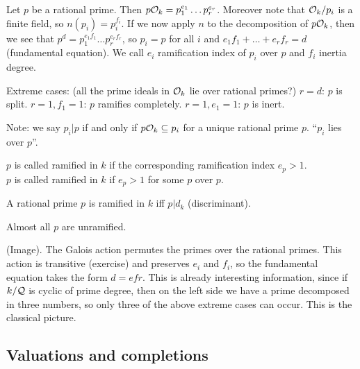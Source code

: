 \begin{outline}
Let $p$ be a rational prime. Then $p \mathcal{O}_k = p_1^{e_1} \ldots p_r^{e_r}$. Moreover note that $\mathcal{O}_k /p_i$ is a finite field, so $n(p_i) = p_i^{f_i}$. If we now apply $n$ to the decomposition of $p\mathcal{O}_k$, then we see that $p^d = p_1^{e_1 f_1}\ldots p_r^{e_r f_r}$, so $p_i=p$ for all $i$ and $e_1 f_1 + \ldots + e_r f_r = d$ (fundamental equation). We call $e_i$ ramification index of $p_i$ over $p$ and $f_i$ inertia degree. 

\1 Extreme cases: (all the prime ideals in $\mathcal{O}_k$ lie over rational primes?)
    \2 $r=d$: $p$ is split.
    \2 $r=1, f_1 = 1$: $p$ ramifies completely. 
    \2 $r=1, e_1 = 1$: $p$ is inert. 

\0 Note: we say $p_i | p$ if and only if $p\mathcal{O}_k \subseteq p_i$ for a unique rational prime $p$. \enquote{$p_i$ lies over $p$}.

\0 \begin{definition}
    $p$ is called ramified in $k$ if the corresponding ramification index $e_p >1$.\\ 
    $p$ is called ramified in $k$ if $e_p > 1$ for some $p$ over $p$.
\end{definition}

\0 \begin{theorem}
    A rational prime $p$ is ramified in $k$ iff $p | d_k$ (discriminant). 
\end{theorem}

\0 \begin{theorem}
    Almost all $p$ are unramified. 
\end{theorem}


(Image). The Galois action permutes the primes over the rational primes. This action is transitive (exercise) and preserves $e_i$ and $f_i$, so the fundamental equation takes the form $d= e f r$. This is already interesting information, since if $k/\mathcal{Q}$ is cyclic of prime degree, then on the left side we have a prime decomposed in three numbers, so only three of the above extreme cases can occur. This is the classical picture. 
\end{outline}

\subsection{Valuations and completions}

